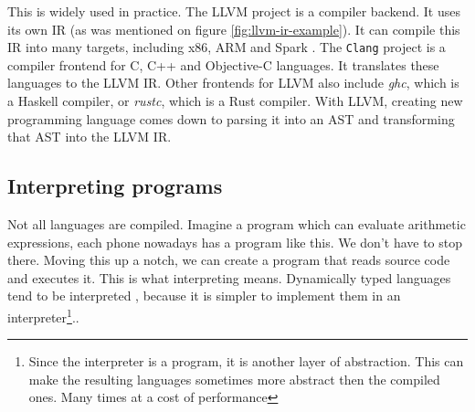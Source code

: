 This is widely used in practice. The LLVM \cite{llvm} project is a compiler backend. It uses its own IR (as was mentioned on figure \ref{fig:llvm-ir-example}).
It can compile this IR into many targets, including x86, ARM and Spark . The \texttt{Clang} project is a compiler frontend for C, C++ and Objective-C languages.
It translates these languages to the LLVM IR. Other frontends for LLVM also include \textit{ghc}, which is a Haskell compiler, or \textit{rustc}, which is a Rust compiler.
With LLVM, creating new programming language comes down to parsing it into an AST and transforming that AST into the LLVM IR.

\subsection{Interpreting programs}
Not all languages are compiled. Imagine a program which can evaluate arithmetic expressions, each phone nowadays has a program like this.
We don't have to stop there. Moving this up a notch, we can create a program that reads source code and executes it.
This is what interpreting means. Dynamically typed languages tend to be interpreted \cite{python, lua, javascript}, because it is simpler
to implement them in an interpreter\footnote{Since the interpreter is a program, it is another layer of abstraction. This can make
the resulting languages sometimes more abstract then the compiled ones. Many times at a cost of performance}..

